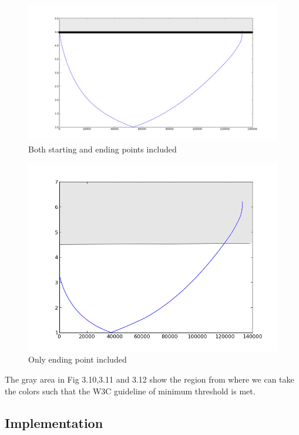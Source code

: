 \begin{figure}[!htb]
\centering
\includegraphics[width=\linewidth]{CR2.png}
\caption{Both starting and ending points included}
\label{fig:sub2}
\end{figure}

\begin{figure}[!htb]
\centering
\includegraphics[width=\linewidth]{CR3.png}
\caption{Only ending point included}
\label{fig:sub3}
\end{figure}


The gray area in Fig 3.10,3.11 and 3.12 show the region from where we can take the colors such that the W3C guideline of minimum threshold is met.

\subsection{Implementation}
\label{Implementation}

